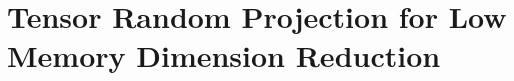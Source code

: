 \documentclass[phd,tocprelim]{cornell}
\numberwithin{equation}{section}
\begin{document}
\chapter{Tensor Random Projection for Low Memory Dimension Reduction}






\begin{subappendices}




\end{subappendices}
\clearpage


	
\end{document}
